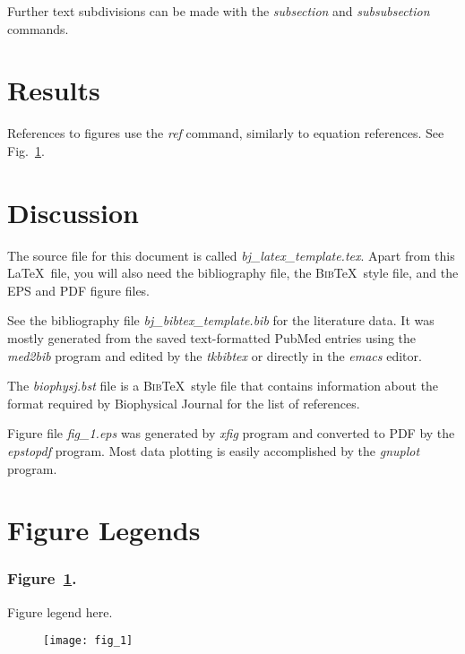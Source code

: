 \documentclass[11pt,titlepage]{article}
\newcommand{\BibTeX}{\textsc{Bib}\TeX}       %
\begin{document}
Further text subdivisions can be made with the \emph{subsection} and
\emph{subsubsection} commands.

\section*{Results}

References to figures use the \emph{ref} command, similarly to equation
references.  See Fig.~\ref{fig:result_fig}.

\section*{Discussion}

The source file for this document is called
\emph{bj\_latex\_template.tex}.  Apart from this \LaTeX\ file, you
will also need the bibliography file, the \BibTeX\ style file, and the
EPS and PDF figure files.

See the bibliography file \emph{bj\_bibtex\_template.bib} for the
literature data.  It was mostly generated from the saved
text-formatted PubMed entries using the \emph{med2bib} program and
edited by the \emph{tkbibtex} or directly in the \emph{emacs} editor.

The \emph{biophysj.bst} file is a \BibTeX\ style file that contains
information about the format required by Biophysical Journal for the
list of references.

Figure file \emph{fig\_1.eps} was generated by \emph{xfig} program and
converted to PDF by the \emph{epstopdf} program.  Most data plotting
is easily accomplished by the \emph{gnuplot} program.



\clearpage
\section*{Figure Legends}
\subsubsection*{Figure~\ref{fig:result_fig}.}
Figure legend here.

\clearpage
\begin{figure}
   \begin{center}
      \texttt{[image: fig\_1]}
      \caption{}
      \label{fig:result_fig}
   \end{center}
\end{figure}

\end{document}
